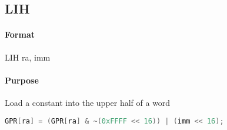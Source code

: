 \subsection{LIH}


\paragraph{Format} LIH ra, imm

\paragraph{Purpose} Load a constant into the upper half of a word

\begin{lstlisting}[language=C]
    GPR[ra] = (GPR[ra] & ~(0xFFFF << 16)) | (imm << 16);
\end{lstlisting}